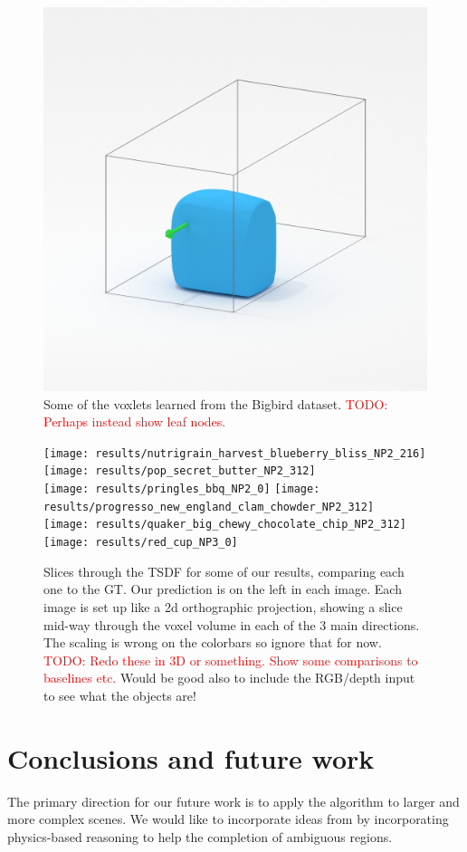 \documentclass[10pt,twocolumn,letterpaper]{article}
\newcommand{\todo}[1]{\textcolor{red}{TODO: #1}}
\begin{document}
\begin{figure}
     \includegraphics[width=0.32\columnwidth, clip=true, trim=150 150 150 150]{voxlets/44_marching_cubes.jpg}
     \caption{Some of the voxlets learned from the Bigbird dataset. \todo{Perhaps instead show leaf nodes.}}
\end{figure}


\newcommand{\resultswidth}{0.41\columnwidth}
\begin{figure}
     \texttt{[image: results/nutrigrain\_harvest\_blueberry\_bliss\_NP2\_216]}
     \texttt{[image: results/pop\_secret\_butter\_NP2\_312]}\\
     \texttt{[image: results/pringles\_bbq\_NP2\_0]}
     \texttt{[image: results/progresso\_new\_england\_clam\_chowder\_NP2\_312]}\\
     \texttt{[image: results/quaker\_big\_chewy\_chocolate\_chip\_NP2\_312]}
     \texttt{[image: results/red\_cup\_NP3\_0]}
     \caption{Slices through the TSDF for some of our results, comparing each one to the GT. 
     Our prediction is on the left in each image.
     Each image is set up like a 2d orthographic projection, showing a slice mid-way through the voxel volume in each of the 3 main directions.
     The scaling is wrong on the colorbars so ignore that for now.
     \todo{Redo these in 3D or something. Show some comparisons to baselines etc.}
     Would be good also to include the RGB/depth input to see what the objects are!}
\end{figure}




\section{Conclusions and future work}


The primary direction for our future work is to apply the algorithm to larger and more complex scenes.
We would like to incorporate ideas from \cite{zheng-cvpr-2013, shao-siggraphasia-2014} by incorporating physics-based reasoning to help the completion of ambiguous regions.
\end{document}
